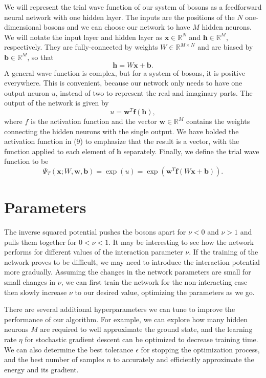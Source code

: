 \documentclass[prb,aps,twocolumn,showpacs,10pt]{revtex4-1}
\begin{document}
We will represent the trial wave function of our system of bosons as a feedforward neural network with one hidden layer. The inputs are the positions of the $N$ one-dimensional bosons and we can choose our network to have $M$ hidden neurons. We will notate the input layer and hidden layer as $\bm{x}\in\mathbb{R}^N$ and $\bm{h}\in\mathbb{R}^M$, respectively. They are fully-connected by weights $W \in \mathbb{R}^{M\times N}$ and are biased by $\bm{b}\in\mathbb{R}^M$, so that
\begin{equation}
\bm{h}=W\bm{x}+\bm{b}.
\end{equation}
A general wave function is complex, but for a system of bosons, it is positive everywhere. This is convenient, because our network only needs to have one output neuron $u$, instead of two to represent the real and imaginary parts. The output of the network is given by
 \begin{equation}
 u = \bm{w}^T \bm{f}(\bm{h}),
 \end{equation}
 where $f$ is the activation function and the vector $\bm{w}\in\mathbb{R}^M$ contains the weights connecting the hidden neurons with the single output. We have bolded the activation function in (9) to emphasize that the result is a vector, with the function applied to each element of $\bm{h}$ separately. Finally, we define the trial wave function to be 
 \begin{equation}
 \Psi_T(\bm{x};W, \bm{w}, \bm{b}) = \exp (u) = \exp(\bm{w}^T \bm{f}(W\bm{x}+\bm{b})).
 \end{equation}



\section{Parameters}
The inverse squared potential pushes the bosons apart for $\nu<0$ and $\nu > 1$ and pulls them together for $0< \nu <1$. It may be interesting to see how the network performs for different values of the interaction parameter $\nu$. If the training of the network proves to be difficult, we may need to introduce the interaction potential more gradually. Assuming the changes in the network parameters are small for small changes in $\nu$, we can first train the network for the non-interacting case then slowly increase $\nu$ to our desired value, optimizing the parameters as we go. 

There are several additional hyperparameters we can tune to improve the performance of our algorithm. For example, we can explore how many hidden neurons $M$ are required to well approximate the ground state, and the learning rate $\eta$ for stochastic gradient descent can be optimized to decrease training time. We can also determine the best tolerance $\epsilon$ for stopping the optimization process, and the best number of samples $n$ to accurately and efficiently approximate the energy and its gradient.
\end{document}
